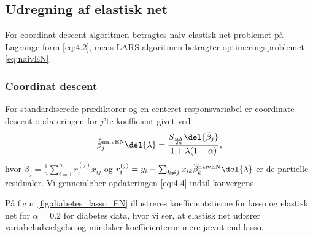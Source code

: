 %
\subsection{Udregning af elastisk net}
For coordinat descent algoritmen betragtes naiv elastisk net problemet på Lagrange form \eqref{eq:4.2}, mens LARS algoritmen betragter optimeringsproblemet \eqref{eq:naivEN}.
%
\subsubsection{Coordinat descent}
For standardiserede prædiktorer og en centeret responsvariabel er coordinate descent opdateringen for $j$'te koefficient givet ved
\begin{align}
\widehat{\beta}^\text{naivEN}_j \del{\lambda}= \frac{S_{\frac{\alpha \lambda}{2n}} \del{\tilde{\beta}_j}}{1 + \lambda (1-\alpha)}, \label{eq:4.4}
\end{align}
hvor \(\tilde{\beta}_j = \frac{1}{n} \sum_{i=1}^n r_{i}^{(j)} x_{ij}\) og \(r_{i}^{(j)} = y_i - \sum_{k \neq j} x_{ik} \widehat{\beta}^\text{naivEN}_k \del{\lambda}\) er de partielle residualer.
Vi gennemløber opdateringen \eqref{eq:4.4} indtil konvergens.

\begin{eks}
På figur \ref{fig:diabetes_lasso_EN} illustreres koefficientstierne for lasso og elastisk net for \(\alpha = 0.2\) for diabetes data, hvor vi ser, at elastisk net udfører variabeludvælgelse og mindsker koefficienterne mere jævnt end lasso.

\end{eks}

